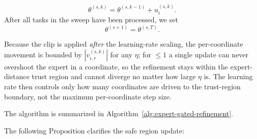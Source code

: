 \documentclass[11pt]{article}
\begin{document}
\begin{equation}
    \theta^{(s,k)}
    =
    \theta^{(s,k-1)} + u_i^{(s,k)}.
    \label{eq:sequential-single-task-update}
\end{equation}
After all tasks in the sweep have been processed, we set
\begin{equation}
    \theta^{(s+1)}=\theta^{(s,T)}.
    \label{eq:sequential-sweep-update}
\end{equation}

Because the clip is applied \emph{after} the learning-rate scaling, the per-coordinate movement is bounded by $|v_{i,r}^{(s,k)}|$ for any $\eta$; for $\le 1$ a single update can never overshoot the expert in a coordinate, so the refinement stays within the expert-distance trust region and cannot diverge no matter how large $\eta$ is. The learning rate then controls only how many coordinates are driven to the trust-region boundary, not the maximum per-coordinate step size. 

The algorithm is summarized in Algorithm~\ref{alg:expert-gated-refinement}.



The following Proposition clarifies the safe region update:
\end{document}
